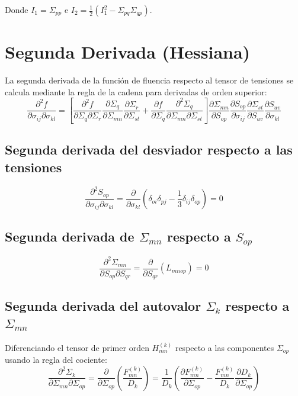 \documentclass[12pt]{article}
\begin{document}
Donde $I_1 = \Sigma_{pp}$ e $I_2 = \frac{1}{2}(I_1^2 - \Sigma_{pq}\Sigma_{qp})$.

\section{Segunda Derivada (Hessiana)}

La segunda derivada de la función de fluencia respecto al tensor de tensiones se calcula mediante la regla de la cadena para derivadas de orden superior:
\begin{equation}
    \frac{\partial^2 f}{\partial \sigma_{ij} \partial \sigma_{kl}} = \left[ \frac{\partial^2 f}{\partial \Sigma_q \partial \Sigma_r} \frac{\partial \Sigma_q}{\partial \Sigma_{mn}} \frac{\partial \Sigma_r}{\partial \Sigma_{st}} + \frac{\partial f}{\partial \Sigma_q} \frac{\partial^2 \Sigma_q}{\partial \Sigma_{mn} \partial \Sigma_{st}} \right] \frac{\partial \Sigma_{mn}}{\partial S_{op}} \frac{\partial S_{op}}{\partial \sigma_{ij}} \frac{\partial \Sigma_{st}}{\partial S_{uv}} \frac{\partial S_{uv}}{\partial \sigma_{kl}}
\end{equation}

\subsection{Segunda derivada del desviador respecto a las tensiones}
\begin{equation}
    \frac{\partial^2 S_{op}}{\partial \sigma_{ij} \partial \sigma_{kl}} = \frac{\partial}{\partial \sigma_{kl}}\left( \delta_{oi}\delta_{pj} - \frac{1}{3}\delta_{ij}\delta_{op} \right) = 0
\end{equation}

\subsection{Segunda derivada de $\Sigma_{mn}$ respecto a $S_{op}$}
\begin{equation}
    \frac{\partial^2 \Sigma_{mn}}{\partial S_{op} \partial S_{qr}} = \frac{\partial}{\partial S_{qr}} (L_{mnop}) = 0
\end{equation}

\subsection{Segunda derivada del autovalor $\Sigma_k$ respecto a $\Sigma_{mn}$}
Diferenciando el tensor de primer orden $H_{mn}^{(k)}$ respecto a las componentes $\Sigma_{op}$ usando la regla del cociente:
\begin{equation}
    \frac{\partial^2 \Sigma_k}{\partial \Sigma_{mn} \partial \Sigma_{op}} = \frac{\partial}{\partial \Sigma_{op}} \left( \frac{F_{mn}^{(k)}}{D_k} \right) = \frac{1}{D_k} \left( \frac{\partial F_{mn}^{(k)}}{\partial \Sigma_{op}} - \frac{F_{mn}^{(k)}}{D_k} \frac{\partial D_k}{\partial \Sigma_{op}} \right)
\end{equation}
\end{document}
